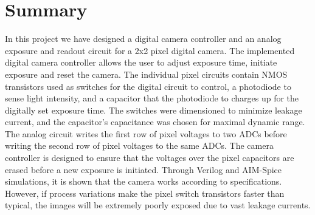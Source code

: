 \section{Summary}

In this project we have designed a digital camera controller and an analog exposure and readout circuit for a 2x2 pixel digital camera. The implemented digital camera controller allows the user to adjust exposure time, initiate exposure and reset the camera. The individual pixel circuits contain NMOS transistors used as switches for the digital circuit to control, a photodiode to sense light intensity, and a capacitor that the photodiode to charges up for the digitally set exposure time. The switches were dimensioned to minimize leakage current, and the capacitor's capacitance was chosen for maximal dynamic range. The analog circuit writes the first row of pixel voltages to two ADCs before writing the second row of pixel voltages to the same ADCs. The camera controller is designed to ensure that the voltages over the pixel capacitors are erased before a new exposure is initiated. Through Verilog and AIM-Spice simulations, it is shown that the camera works according to specifications. However, if process variations make the pixel switch transistors faster than typical, the images will be extremely poorly exposed due to vast leakage currents.